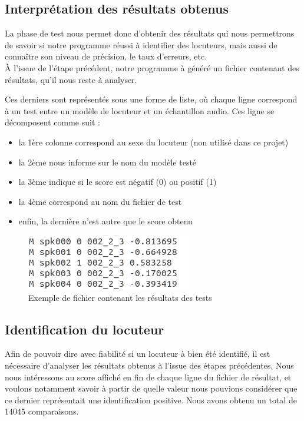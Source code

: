 \documentclass[a4paper, 12pt]{book}
\newcounter{program}[subsection]
\begin{document}
\subsection{Interprétation des résultats obtenus}

La phase de test nous permet donc d'obtenir des résultats qui nous permettrons de savoir si notre programme réussi à identifier des locuteurs, mais aussi de connaître son niveau de précision, le taux d'erreurs, etc.\\

À l'issue de l'étape précédent, notre programme à généré un fichier contenant des résultats, qu'il nous reste à analyser. 

Ces derniers sont représentés sous une forme de liste, où chaque ligne correspond à un test entre un modèle de locuteur et un échantillon audio. Ces ligne se décomposent comme suit :

\begin{itemize}
  \item la 1ère colonne correspond au sexe du locuteur (non utilisé dans ce projet) 
  \item la 2ème nous informe sur le nom du modèle testé
  \item la 3ème indique si le score est négatif (0) ou positif (1)
  \item la 4ème correspond au nom du fichier de test
  \item enfin, la dernière n'est autre que le score obtenu
\end{itemize}

\begin{figure}[htbp]
  \centering
  \includegraphics[width=0.5\linewidth]{images/goodResultExample.png}
  \caption{Exemple de fichier contenant les résultats des tests}
\end{figure}
 

\subsection{Identification du locuteur}

Afin de pouvoir dire avec fiabilité si un locuteur à bien été identifié, il est nécessaire d'analyser les résultats obtenus à l'issue des étapes précédentes. Nous nous intéressons au score affiché en fin de chaque ligne du fichier de résultat, et voulons notamment savoir à partir de quelle valeur nous pouvions considérer que ce dernier représentait une identification positive. Nous avons obtenu un total de 14045 comparaisons.
\end{document}
